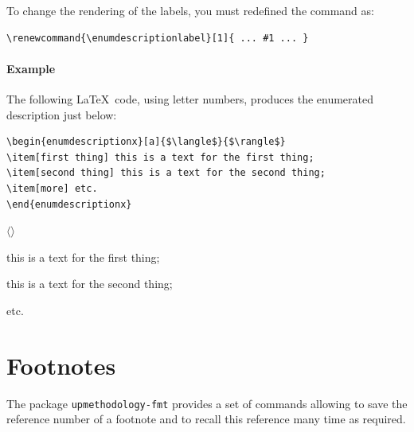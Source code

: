\documentclass[book,taskpackage,specpackage,codepackage]{upmethodology-document}
\begin{document}
To change the rendering of the labels, you must redefined the command as:
\begin{verbatim}
\renewcommand{\enumdescriptionlabel}[1]{ ... #1 ... }
\end{verbatim}


\paragraph{Example} The following \LaTeX~code, using letter numbers, produces the enumerated description just below:
\begin{verbatim}
\begin{enumdescriptionx}[a]{$\langle$}{$\rangle$}
\item[first thing] this is a text for the first thing;
\item[second thing] this is a text for the second thing;
\item[more] etc.
\end{enumdescriptionx}
\end{verbatim}

\begin{enumdescriptionx}[a]{$\langle$}{$\rangle$}
\item[first thing] this is a text for the first thing;
\item[second thing] this is a text for the second thing;
\item[more] etc.
\end{enumdescriptionx}


\section{Footnotes}

The package \texttt{upmethodology-fmt} provides a set of commands allowing to save the reference number of a footnote and to recall this reference many time as required.
\end{document}
